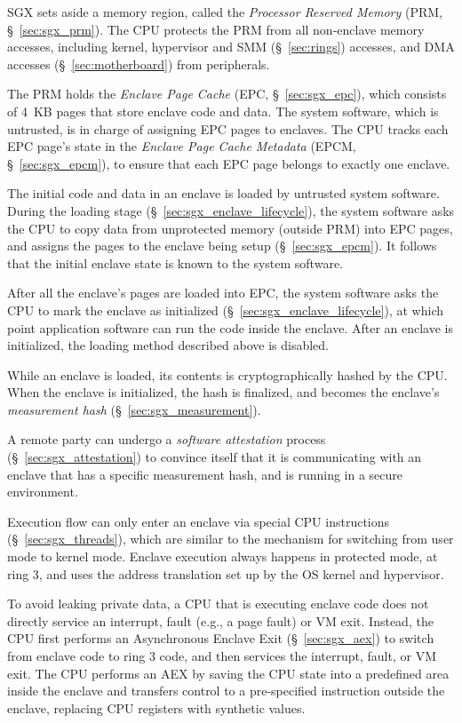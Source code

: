 \label{sec:sgx_intro_tour}

SGX sets aside a memory region, called the \textit{Processor Reserved Memory}
(PRM, \S~\ref{sec:sgx_prm}). The CPU protects the PRM from all non-enclave
memory accesses, including kernel, hypervisor and SMM (\S~\ref{sec:rings})
accesses, and DMA accesses (\S~\ref{sec:motherboard}) from peripherals.

The PRM holds the \textit{Enclave Page Cache} (EPC, \S~\ref{sec:sgx_epc}),
which consists of 4~KB pages that store enclave code and data. The system
software, which is untrusted, is in charge of assigning EPC pages to enclaves.
The CPU tracks each EPC page's state in the \textit{Enclave Page Cache
Metadata} (EPCM, \S~\ref{sec:sgx_epcm}), to ensure that each EPC page belongs
to exactly one enclave.

The initial code and data in an enclave is loaded by untrusted system software.
During the loading stage (\S~\ref{sec:sgx_enclave_lifecycle}), the system
software asks the CPU to copy data from unprotected memory (outside PRM) into
EPC pages, and assigns the pages to the enclave being setup
(\S~\ref{sec:sgx_epcm}). It follows that the initial enclave state is known to
the system software.

After all the enclave's pages are loaded into EPC, the system software asks the
CPU to mark the enclave as initialized (\S~\ref{sec:sgx_enclave_lifecycle}), at
which point application software can run the code inside the enclave. After an
enclave is initialized, the loading method described above is disabled.

While an enclave is loaded, its contents is cryptographically hashed by the
CPU. When the enclave is initialized, the hash is finalized, and becomes the
enclave's \textit{measurement hash} (\S~\ref{sec:sgx_measurement}).

A remote party can undergo a \textit{software attestation} process
(\S~\ref{sec:sgx_attestation}) to convince itself that it is communicating with
an enclave that has a specific measurement hash, and is running in a secure
environment.

Execution flow can only enter an enclave via special CPU instructions
(\S~\ref{sec:sgx_threads}), which are similar to the mechanism for switching
from user mode to kernel mode. Enclave execution always happens in protected
mode, at ring 3, and uses the address translation set up by the OS kernel and
hypervisor.

To avoid leaking private data, a CPU that is executing enclave code does not
directly service an interrupt, fault (e.g., a page fault) or VM exit. Instead,
the CPU first performs an Asynchronous Enclave Exit (\S~\ref{sec:sgx_aex}) to
switch from enclave code to ring 3 code, and then services the interrupt,
fault, or VM exit.  The CPU performs an AEX by saving the CPU state into a
predefined area inside the enclave and transfers control to a pre-specified
instruction outside the enclave, replacing CPU registers with synthetic values.

